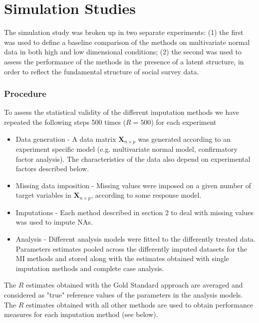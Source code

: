 \maketitle
\section{Simulation Studies}

The simulation study was broken up in two separate experiments: (1) the first was used to define a baseline comparison 
of the methods on multivariate normal data in both high and low dimensional conditions; (2) the second was used to 
assess the performance of the methods in the presence of a latent structure, in order to reflect the fundamental
structure of social survey data.

\subsubsection{Procedure}
	
	To assess the statistical validity of the different imputation methods we have repeated the following steps
	500 times ($R = 500$) for each experiment

	\begin{itemize}
		\item Data generation - A data matrix $\bm{X}_{n \times p}$ was generated according to an experiment 
			specific model (e.g. multivariate normal model, confirmatory factor analysis).
			The characteristics of the data also depend on experimental factors described below.
		\item Missing data imposition - Missing values were imposed on a given number of target variables
			in $\bm{X}_{n \times p}$, according to some response model.
		\item Imputations - Each method described in section 2 to deal with missing values was used to impute
			NAs.
		\item Analysis - Different analysis models were fitted to the differently treated data.
			Parameters estimates pooled across the differently imputed datasets for the MI methods and
			stored along with the estimates obtained with single imputation methods and complete case 
			analysis.
	\end{itemize}

	The $R$ estimates obtained with the Gold Standard approach are averaged and considered as "true" reference
	values of the parameters in the analysis models.
	The $R$ estimates obtained with all other methods are used to obtain performance measures for each imputation 
	method (see below).

